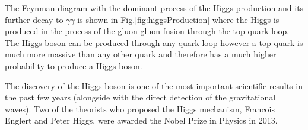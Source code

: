 The Feynman diagram with the dominant process of the Higgs production and its further decay to $\gamma\gamma$ is shown in Fig.\ref{fig:higgsProduction} where the Higgs is produced in the process of the gluon-gluon fusion through the top quark loop. The Higgs boson can be produced through any quark loop however a top quark is much more massive than any other quark and therefore has a much higher probability to produce a Higgs boson. 

The discovery of the Higgs boson is one of the most important scientific results in the past few years (alongside with the direct detection of the gravitational waves). Two of the theorists who proposed the Higgs mechanism, Francois Englert and Peter Higgs, were awarded the Nobel Prize in Physics in 2013.


